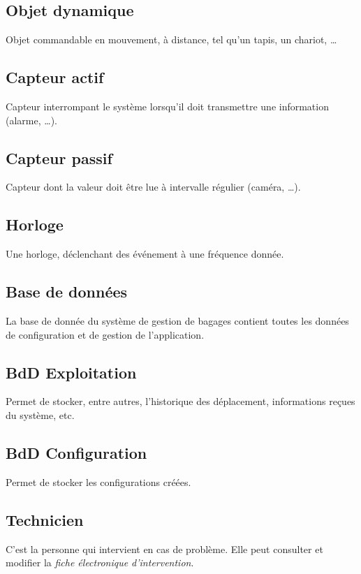 \subsection{Objet dynamique}
\label{obj}
Objet commandable en mouvement, à distance, tel qu'un tapis, un chariot, \ldots

\subsection{Capteur actif}
\label{sensor}
Capteur interrompant le système lorsqu'il doit transmettre une information (alarme, \ldots).

\subsection{Capteur passif}
Capteur dont la valeur doit être lue à intervalle régulier (caméra, \ldots).

\subsection{Horloge}
\label{clock}
Une horloge, déclenchant des événement à une fréquence donnée.

\subsection{Base de données}
\label{bdd}
La base de donnée du système de gestion de bagages contient toutes les données de configuration et de gestion de l'application.

\subsection{BdD Exploitation}
Permet de stocker, entre autres, l'historique des déplacement, informations reçues du système, etc.

\subsection{BdD Configuration}
Permet de stocker les configurations créées.

\subsection{Technicien}
C'est la personne qui intervient en cas de problème. Elle peut consulter et modifier la \textsl{fiche électronique d'intervention}.



